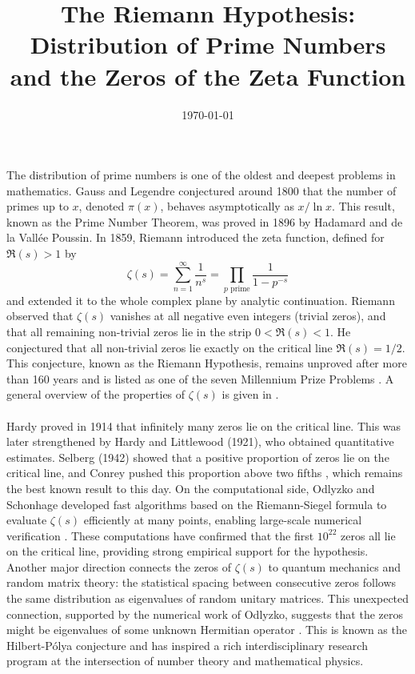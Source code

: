 \documentclass[10pt]{article}
\title{The Riemann Hypothesis: Distribution of Prime Numbers\\and the Zeros of the Zeta Function}
\date{\today}
\begin{document}
\maketitle

\paragraph{}
The distribution of prime numbers is one of the oldest and deepest 
problems in mathematics. Gauss and Legendre conjectured around 1800 
that the number of primes up to $x$, denoted $\pi(x)$, behaves 
asymptotically as $x / \ln x$. This result, known as the Prime Number 
Theorem, was proved in 1896 by Hadamard and de la Vallée Poussin.
In 1859, Riemann introduced the zeta function, defined for $\Re(s) > 1$ by
\[
    \zeta(s) = \sum_{n=1}^{\infty} \frac{1}{n^s} = \prod_{p \text{ prime}} \frac{1}{1-p^{-s}}
\]
and extended it to the whole complex plane by analytic continuation.
Riemann observed that $\zeta(s)$ vanishes at all negative even integers 
(trivial zeros), and that all remaining non-trivial zeros lie in the 
strip $0 < \Re(s) < 1$. He conjectured that all non-trivial zeros lie 
exactly on the critical line $\Re(s) = 1/2$. This conjecture, known as 
the Riemann Hypothesis, remains unproved after more than 160 years and 
is listed as one of the seven Millennium Prize Problems 
\cite{carlson_millennium_2023}. A general overview of the properties 
of $\zeta(s)$ is given in \cite{gourdon_riemann_nodate}.

\paragraph{}
Hardy proved in 1914 that infinitely many zeros lie on the critical line. 
This was later strengthened by Hardy and Littlewood (1921), who obtained 
quantitative estimates. Selberg (1942) showed that a positive proportion 
of zeros lie on the critical line, and Conrey pushed this proportion above 
two fifths \cite{noauthor_more_1989}, which remains the best known result 
to this day. On the computational side, Odlyzko and Schonhage developed 
fast algorithms based on the Riemann-Siegel formula to evaluate $\zeta(s)$ 
efficiently at many points, enabling large-scale numerical verification 
\cite{odlyzko_fast_nodate}. These computations have confirmed that the 
first $10^{22}$ zeros all lie on the critical line, providing strong 
empirical support for the hypothesis. Another major direction connects 
the zeros of $\zeta(s)$ to quantum mechanics and random matrix theory: 
the statistical spacing between consecutive zeros follows the same 
distribution as eigenvalues of random unitary matrices. This unexpected 
connection, supported by the numerical work of Odlyzko, suggests that 
the zeros might be eigenvalues of some unknown Hermitian operator 
\cite{noauthor_riemann_nodate}. This is known as the Hilbert-Pólya 
conjecture and has inspired a rich interdisciplinary research program 
at the intersection of number theory and mathematical physics.
\end{document}
